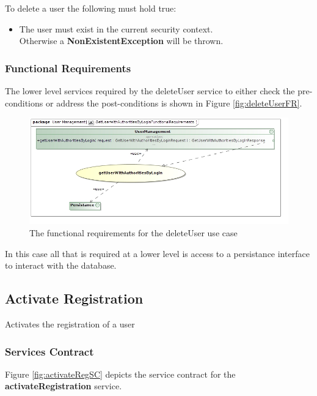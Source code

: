 To delete a user the following must hold true:
\begin{itemize}
	\item The user must exist in the current security context.\\
	Otherwise a \textbf{NonExistentException} will be thrown.
\end{itemize}

\subsubsection{Functional Requirements}
The lower level services required by the deleteUser service
to either check the pre-conditions or address the post-conditions is shown
in Figure \ref{fig:deleteUserFR}.

\begin{figure}[H]
	\begin{center}
		\includegraphics[scale=0.5]{../Diagrams and Charts/Users/GetUserWithAuthoritiesByLoginFunctionalRequirements.jpg}
		\caption{The functional requirements for the deleteUser use case}
		\label{deleteUserFR}
	\end{center}	
\end{figure}

In this case all that is required at a lower level is access to a persistance
interface to interact with the database.


\subsection{Activate Registration}
Activates the registration of a user

\subsubsection{Services Contract}
Figure \ref{fig:activateRegSC} depicts the service
contract for the \textbf{activateRegistration} service.

